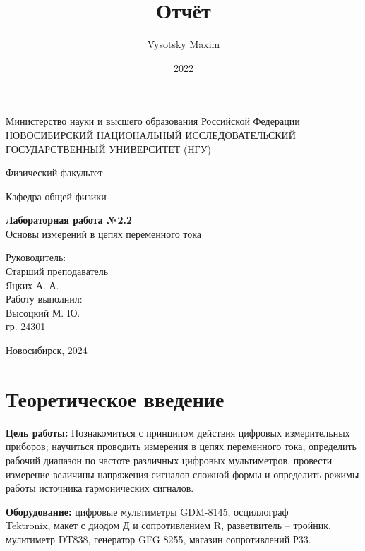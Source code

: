 \documentclass[a4paper,12pt]{article}
\author{Vysotsky Maxim}
\title{Отчёт}
\date{2022}
\begin{document}
	\begin{titlepage}
		\begin{center}
			{Министерство науки и высшего образования Российской Федерации
				НОВОСИБИРСКИЙ НАЦИОНАЛЬНЫЙ ИССЛЕДОВАТЕЛЬСКИЙ
				ГОСУДАРСТВЕННЫЙ УНИВЕРСИТЕТ (НГУ)}
		\end{center}
		\begin{center}
			{Физический факультет}
		\end{center}
		\begin{center}
			{Кафедра общей физики}
		\end{center}
		
		
		\vspace{7cm}
		{
			\begin{center}
				{\bf Лабораторная работа №2.2}\\
				Основы измерений в цепях переменного тока
			\end{center}
		}
		\vspace{2cm}
		\begin{flushright}
			{Руководитель:\\ Старший преподаватель\\
				Яцких А. А.\\
				Работу выполнил:\\
				Высоцкий М. Ю.\\
				\vspace{0.2cm}
				гр. 24301}
		\end{flushright}
		\vspace{3cm}
		\begin{center}
			Новосибирск, 2024
		\end{center}
	\end{titlepage}

\section{Теоретическое введение}
\textbf{Цель работы:} Познакомиться с принципом действия цифровых измерительных приборов; научиться проводить измерения в цепях переменного тока, определить рабочий диапазон по частоте различных цифровых мультиметров, провести измерение величины напряжения сигналов сложной формы и определить режимы работы источника гармонических сигналов.

\textbf{Оборудование:} цифровые мультиметры GDM-8145, осциллограф \\Tektronix, макет с
диодом Д и сопротивлением R, разветвитель – тройник, мультиметр DT838, генератор GFG 8255,  магазин сопротивлений Р33.
\end{document}
